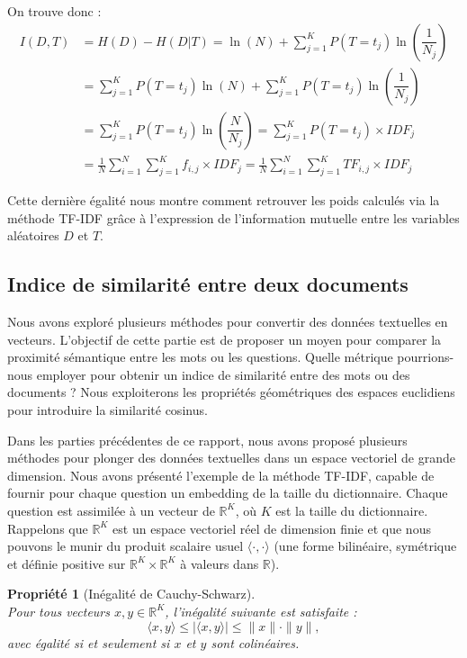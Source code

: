 \documentclass[12pt]{article}
\newtheorem{prop}{Propriété}
\theoremstyle{definition}
\begin{document}
	On trouve donc :
	\begin{align*}
		I(D,T) &= H(D) - H(D|T) = \ln(N) + \sum_{j=1}^{K}P(T=t_j)\ln\left(\dfrac{1}{N_j}\right)\\
			&= \sum_{j=1}^{K}P(T=t_j)\ln(N) + \sum_{j=1}^{K}P(T=t_j)\ln\left(\dfrac{1}{N_j}\right)\\
			&= \sum_{j=1}^{K}P(T=t_j)\ln\left(\dfrac{N}{N_j}\right) = \sum_{j=1}^{K}P(T=t_j) \times IDF_j\\
			&= \frac{1}{N}\sum_{i=1}^{N}\sum_{j=1}^{K} f_{i,j}\times IDF_j = \frac{1}{N}\sum_{i=1}^{N}\sum_{j=1}^{K} TF_{i,j}\times IDF_j
	\end{align*}

\newpage 	
Cette dernière égalité nous montre comment retrouver les poids calculés via la méthode TF-IDF grâce à l'expression de l'information mutuelle entre les variables aléatoires $D$ et $T$.
\subsection{Indice de similarité entre deux documents}
Nous avons exploré plusieurs méthodes pour convertir des données textuelles en vecteurs. L'objectif de cette partie est de proposer un moyen pour comparer la proximité sémantique entre les mots ou les questions. Quelle métrique pourrions-nous employer pour obtenir un indice de similarité entre des mots ou des documents ? Nous exploiterons les propriétés géométriques des espaces euclidiens pour introduire la similarité cosinus.

Dans les parties précédentes de ce rapport, nous avons proposé plusieurs méthodes pour plonger des données textuelles dans un espace vectoriel de grande dimension. Nous avons présenté l'exemple de la méthode TF-IDF, capable de fournir pour chaque question un embedding de la taille du dictionnaire. Chaque question est assimilée à un vecteur de $\mathbb{R}^K$, où $K$ est la taille du dictionnaire. Rappelons que $\mathbb{R}^K$ est un espace vectoriel réel de dimension finie et que nous pouvons le munir du produit scalaire usuel $\langle \cdot, \cdot \rangle$ (une forme bilinéaire, symétrique et définie positive sur $\mathbb{R}^K \times \mathbb{R}^K$ à valeurs dans $\mathbb{R}$). 

\begin{prop}[Inégalité de Cauchy-Schwarz]\hfil\\
	Pour tous vecteurs $x, y \in \mathbb{R}^K$, l'inégalité suivante est satisfaite :
	$$\langle x, y \rangle \leq |\langle x, y \rangle| \leq \|x\| \cdot \|y\|,$$
	avec égalité si et seulement si $x$ et $y$ sont colinéaires.
\end{prop}
  
\end{document}
